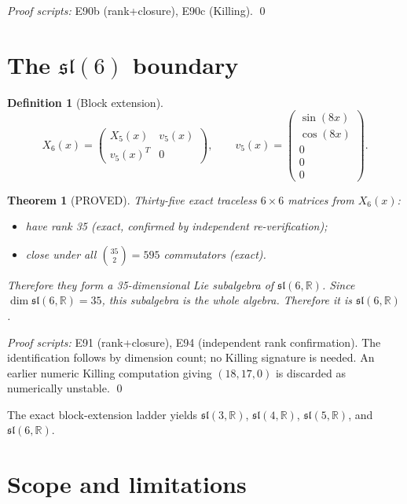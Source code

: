 \documentclass[11pt]{article}
\newtheorem{theorem}{Theorem}
\theoremstyle{definition}
\newtheorem{definition}{Definition}
\begin{document}
\noindent\textit{Proof scripts:} E90b (rank+closure), E90c (Killing). \qed

\section{The $\mathfrak{sl}(6)$ boundary}

\begin{definition}[Block extension]
\[
X_6(x) =
\begin{pmatrix}
X_5(x) & v_5(x) \\
v_5(x)^T & 0
\end{pmatrix},
\qquad
v_5(x) =
\begin{pmatrix}
\sin(8x) \\
\cos(8x) \\
0 \\
0 \\
0
\end{pmatrix}.
\]
\end{definition}

\begin{theorem}[PROVED]
Thirty-five exact traceless $6\times6$ matrices from $X_6(x)$:
\begin{itemize}
\item have rank 35 (exact, confirmed by independent re-verification);
\item close under all $\binom{35}{2}=595$ commutators (exact).
\end{itemize}
Therefore they form a 35-dimensional Lie subalgebra of $\mathfrak{sl}(6,\mathbb{R})$. Since $\dim\mathfrak{sl}(6,\mathbb{R})=35$, this subalgebra is the whole algebra. Therefore it is $\mathfrak{sl}(6,\mathbb{R})$.
\end{theorem}

\noindent\textit{Proof scripts:} E91 (rank+closure), E94 (independent rank confirmation). The identification follows by dimension count; no Killing signature is needed. An earlier numeric Killing computation giving $(18,17,0)$ is discarded as numerically unstable. \qed

\begin{corollary}
The exact block-extension ladder yields $\mathfrak{sl}(3,\mathbb{R})$, $\mathfrak{sl}(4,\mathbb{R})$, $\mathfrak{sl}(5,\mathbb{R})$, and $\mathfrak{sl}(6,\mathbb{R})$.
\end{corollary}

\section{Scope and limitations}
\end{document}
